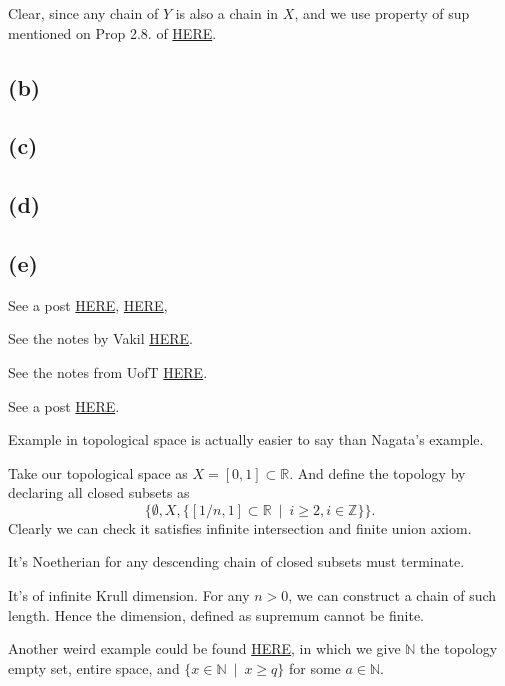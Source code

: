 Clear, since any chain of $Y$ is also a chain in $X$, and we use property of sup mentioned on Prop 2.8. of \href{https://www.math.ucdavis.edu/~hunter/m125b/ch2.pdf}{HERE}.

\subsection{(b)}

\subsection{(c)}

\subsection{(d)}

\subsection{(e)}

See a post \href{https://mathoverflow.net/questions/21067/noetherian-rings-of-infinite-krull-dimension?_gl=1*1sl382c*_ga*MTI0OTg5MDM2My4xNjk0NjI0Nzc1*_ga_S812YQPLT2*MTcwMzU3MjAxNS4xNjIuMS4xNzAzNTcyMDE4LjAuMC4w}{HERE}, 
\href{https://math.stackexchange.com/questions/1109732/noetherian-ring-with-infinite-krull-dimension-nagatas-example}{HERE}, 

See the notes by Vakil \href{https://math.stanford.edu/~vakil/0708-216/216class19.pdf}{HERE}.

See the notes from UofT \href{https://www.uio.no/studier/emner/matnat/math/MAT4210/v18/mat4210notes5.pdf}{HERE}.

See a post \href{https://math.stackexchange.com/questions/4013748/example-of-a-locally-noetherian-space-x-and-a-point-x-such-that-dim-xx-in}{HERE}.


Example in topological space is actually easier to say than Nagata's example.

Take our topological space as $X=[0,1]\subset\mathbb R$. And define the topology by declaring all closed subsets as
\[\{\emptyset,X,\{[1/n,1]\subset \mathbb R~\mid~ i\geq 2, i\in\mathbb Z\}\}.\]
Clearly we can check it satisfies infinite intersection and finite union axiom.

It's Noetherian for any descending chain of closed subsets must terminate. 

It's of infinite Krull dimension. For any $n>0$, we can construct a chain of such length. Hence the dimension, defined as supremum cannot be finite.

Another weird example could be found \href{https://www.uio.no/studier/emner/matnat/math/MAT4210/v18/mat4210notes5.pdf}{HERE}, in which we give $\mathbb N$ the topology empty set, entire space, and $\{x\in\mathbb N ~\mid~ x\geq q\}$ for some $a\in \mathbb N$.